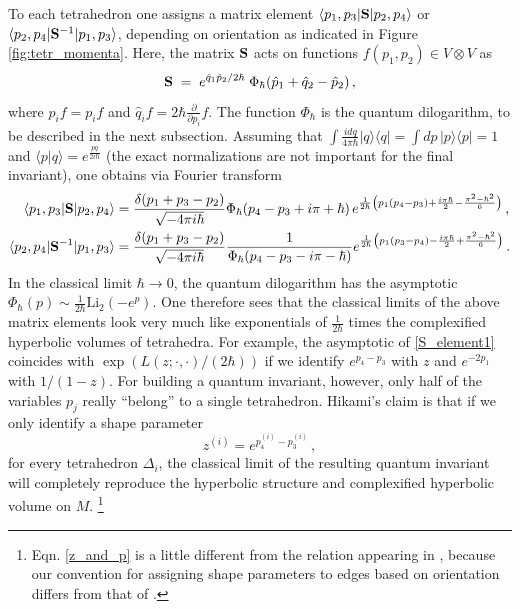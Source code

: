 \documentclass[hyper]{JHEP3}
\newcommand\be{\begin{equation}}
\newcommand\ee{\end{equation}}
\def\={\;=\;}
\def\Li{\text{Li}_2}
\begin{document}
To each tetrahedron one assigns a matrix element $\langle p_1,p_3|{\bf S}|p_2,p_4\rangle$
or $\langle p_2,p_4|{\bf S}^{-1}|p_1,p_3\rangle$,
depending on orientation as indicated in Figure \ref{fig:tetr_momenta}.
Here, the matrix ${\bf S}$ acts on functions $f(p_1,p_2) \in V\otimes V$ as
\be
{\bf S} \= e^{\hat{q}_1\hat{p}_2/2\hbar}\; \Phi_\hbar ( \hat{p}_1 + \hat{q}_2 - \hat{p}_2)\,,
\label{S-matrix}
\ee
where $\hat{p}_i f =p_i f$ and $\hat{q}_i f = 2\hbar \frac{\partial}{\partial p_i} f$.
The function $\Phi_\hbar$ is the quantum dilogarithm, to be described in the next subsection.
Assuming that
$\int \frac{idq}{4\pi\hbar} |q \rangle \langle q| = \int dp\, |p\rangle \langle p| = 1$
and $\langle p | q \rangle = e^{\frac{pq}{2i\hbar}}$
(the exact normalizations are not important for the final invariant), one obtains via Fourier transform
\small
\begin{align}
\langle p_1,p_3|{\bf S}|p_2,p_4\rangle
& = \frac{\delta(p_1 + p_3 - p_2)}{\sqrt{-4\pi i\hbar}} \Phi_{\hbar} (p_4 - p_3 + i\pi + \hbar)
\, e^{\frac{1}{2\hbar} \left( p_1 (p_4 - p_3) + \frac{i\pi\hbar}{2} - \frac{\pi^2-\hbar^2}{6} \right) }\,,
\label{S_element1} \\
\langle p_2,p_4|{\bf S}^{-1}|p_1,p_3\rangle
& = \frac{\delta(p_1 + p_3 - p_2)}{\sqrt{-4\pi i\hbar}} \frac{1}{\Phi_{\hbar}
(p_4 - p_3 - i\pi-\hbar)} e^{\frac{1}{2\hbar} \left( p_1 (p_3 - p_4) - \frac{i\pi\hbar}{2}
+ \frac{\pi^2-\hbar^2}{6} \right)}\,.
\label{S_element2}
\end{align}
\normalsize
In the classical limit $\hbar \to 0$, the quantum dilogarithm has the asymptotic $\Phi_\hbar(p)\sim \frac{1}{2\hbar} \Li(-e^p)$. One therefore sees that the classical limits of the above matrix elements look very much like exponentials of $\frac{1}{2\hbar}$ times the complexified hyperbolic volumes of tetrahedra. For example, the asymptotic of \eqref{S_element1} coincides with $\exp(L(z;\cdot,\cdot)/(2\hbar))$ if we identify $e^{p_4-p_3}$ with $z$ and $e^{-2p_1}$ with $1/(1-z)$. For building a quantum invariant, however, only half of the variables $p_j$ really ``belong'' to a single tetrahedron. Hikami's claim \cite{hikami-2001-16, hikami-2006} is that if we only identify a shape parameter
%
\be
z^{(i)} = e^{p_4^{(i)}-p_3^{(i)}}\,,
\label{z_and_p}
\ee
%
for every tetrahedron $\Delta_i$, the classical limit of the resulting quantum invariant will completely reproduce the hyperbolic structure and complexified hyperbolic volume on $M$.%
%
\footnote{Eqn. \eqref{z_and_p} is a little different from the relation appearing in \cite{hikami-2001-16, hikami-2006}, because our convention for assigning shape parameters to edges based on orientation differs from that of \cite{hikami-2001-16, hikami-2006}.}
\end{document}
